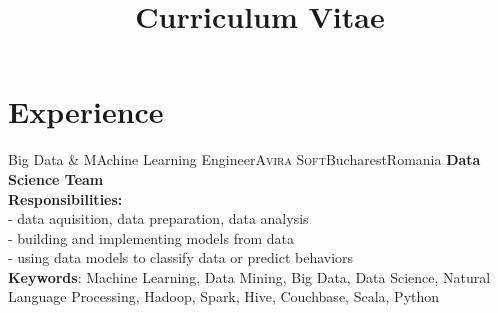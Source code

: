 \documentclass[11pt,a4paper,sans]{moderncv}
\title{Curriculum Vitae}
\begin{document}
\makecvtitle



\section{Experience}

{Big Data \& MAchine Learning Engineer}{\textsc{Avira Soft}}{Bucharest}{Romania}
{\textbf{Data Science Team} \\
    \textbf{Responsibilities:} \\
    - data aquisition, data preparation, data analysis \\
    - building and implementing models from data \\
    - using data models to classify data or predict behaviors \\
    \textbf{Keywords}: Machine Learning, Data Mining, Big Data, Data Science, 
    Natural Language Processing, Hadoop, Spark, Hive, Couchbase, Scala, Python }
\end{document}

